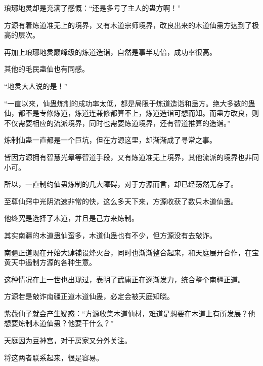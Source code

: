 \begin{this_body}
琅琊地灵却是充满了感慨：“还是多亏了主人的蛊方啊！”

方源有着炼道准无上的境界，又有木道宗师境界，改良出来的木道仙蛊方达到了极高的层次。

再加上琅琊地灵巅峰级的炼道造诣，自然是事半功倍，成功率很高。

其他的毛民蛊仙也有同感。

“地灵大人说的是！”

“一直以来，仙蛊炼制的成功率太低，都是局限于炼道造诣和蛊方。绝大多数的蛊仙，都不是专修炼道，炼道连兼修都算不上，炼道造诣可想而知。而蛊方改良，则不仅需要相应的流派境界，同时也需要炼道境界，还有智道推算的造诣。”

炼制仙蛊一直都是一个巨坑，但在方源这里，却渐渐成了寻常之事。

皆因方源拥有智慧光晕等智道手段，又有炼道准无上境界，其他流派的境界也非同小可。

所以，一直制约仙蛊炼制的几大障碍，对于方源而言，却已经荡然无存了。

至尊仙窍中光阴流速非常的快，这么多天下来，方源收获了数只木道仙蛊。

他终究是选择了木道，并且是己方来炼制。

其实南疆的木道蛊仙蛮多，木道仙蛊也有不少，但方源没有去敲诈。

南疆正道现在开始大肆铺设烽火台，同时也渐渐整合起来，和天庭展开合作，在宝黄天中遏制方源的各种生意。

这种情况在上一世也出现过，表明了武庸正在逐渐发力，统合整个南疆正道。

方源若是敲诈南疆正道木道仙蛊，必定会被天庭知晓。

紫薇仙子就会产生疑惑：“方源收集木道仙材，难道是想要在木道上有所发展？他想要炼制木道仙蛊？他要干什么？”

天庭因为豆神宫，对于房家又分外关注。

将这两者联系起来，很是容易。

\end{this_body}

